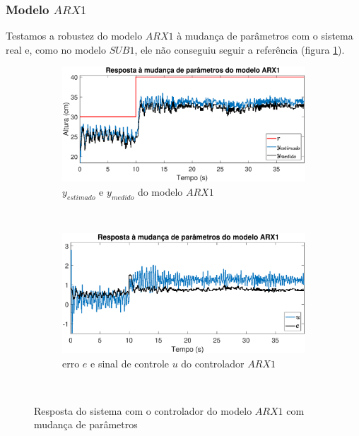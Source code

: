 \subsubsection{Modelo $ARX1$}
Testamos a robustez do modelo $ARX1$ à mudança de parâmetros com o sistema real e, como no modelo $SUB1$, ele não conseguiu seguir a referência (figura \ref{fig:mprarx1y}).
\begin{figure}[htb]
	\centering
	\begin{subfigure}[t]{0.48\textwidth}
		\includegraphics[width=1\linewidth]{mprarx1y}
		\caption[$y_{estimado}$ e $y_{medido}$ do modelo $ARX1$]{$y_{estimado}$ e $y_{medido}$ do modelo $ARX1$}
		\label{fig:mprarx1y}
	\end{subfigure}
	~ %
	\begin{subfigure}[t]{0.48\textwidth}
		\includegraphics[width=1\linewidth]{mprarx1e}
		\caption[erro $e$ e sinal de controle $u$ do controlador $ARX1$]{erro $e$ e sinal de controle $u$ do controlador $ARX1$}
		\label{fig:mprarx1e}
	\end{subfigure}
	~ %
	
	\caption{Resposta do sistema com o controlador do modelo $ARX1$ com mudança de parâmetros}\label{fig:mprarx1}
\end{figure}

